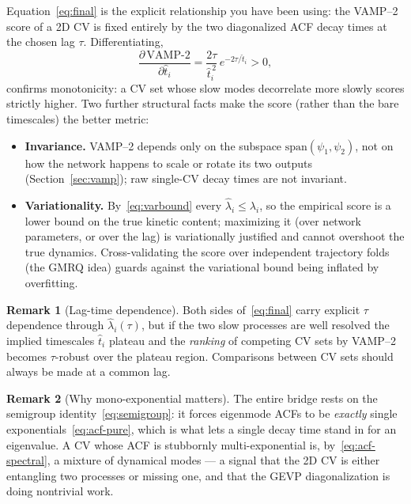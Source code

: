 \documentclass[11pt]{article}
\theoremstyle{plain}
\theoremstyle{definition}
\newtheorem{remark}{Remark}
\begin{document}
Equation~\eqref{eq:final} is the explicit relationship you have been using: the
VAMP--2 score of a 2D CV is fixed entirely by the two diagonalized ACF decay times at
the chosen lag $\tau$. Differentiating,
\begin{equation}
\frac{\partial\,\mathrm{VAMP\text{-}2}}{\partial \hat t_i}
=\frac{2\tau}{\hat t_i^{\,2}}\,e^{-2\tau/\hat t_i}>0 ,
\end{equation}
confirms monotonicity: a CV set whose slow modes decorrelate more slowly scores
strictly higher. Two further structural facts make the score (rather than the bare
timescales) the better metric:
\begin{itemize}[leftmargin=1.6em,itemsep=2pt]
\item \textbf{Invariance.} VAMP--2 depends only on the subspace
$\mathrm{span}(\psi_1,\psi_2)$, not on how the network happens to scale or rotate its
two outputs (Section~\ref{sec:vamp}); raw single-CV decay times are not invariant.
\item \textbf{Variationality.} By~\eqref{eq:varbound} every $\hat\lambda_i\le\lambda_i$,
so the empirical score is a lower bound on the true kinetic content; maximizing it
(over network parameters, or over the lag) is variationally justified and cannot
overshoot the true dynamics. Cross-validating the score over independent trajectory
folds (the GMRQ idea) guards against the variational bound being inflated by
overfitting.
\end{itemize}

\begin{remark}[Lag-time dependence]
Both sides of~\eqref{eq:final} carry explicit $\tau$ dependence through
$\hat\lambda_i(\tau)$, but if the two slow processes are well resolved the implied
timescales $\hat t_i$ plateau and the \emph{ranking} of competing CV sets by VAMP--2
becomes $\tau$-robust over the plateau region. Comparisons between CV sets should
always be made at a common lag.
\end{remark}

\begin{remark}[Why mono-exponential matters]
The entire bridge rests on the semigroup identity~\eqref{eq:semigroup}: it forces
eigenmode ACFs to be \emph{exactly} single exponentials~\eqref{eq:acf-pure}, which is
what lets a single decay time stand in for an eigenvalue. A CV whose ACF is
stubbornly multi-exponential is, by~\eqref{eq:acf-spectral}, a mixture of dynamical
modes --- a signal that the 2D CV is either entangling two processes or missing one,
and that the GEVP diagonalization is doing nontrivial work.
\end{remark}
\end{document}
